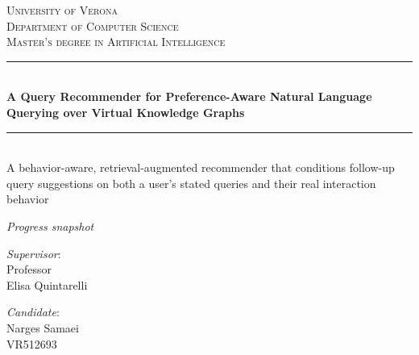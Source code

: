 \documentclass[a4paper,11pt]{report}
\begin{document}
\begin{titlepage}
\newcommand{\HRule}{\rule{\linewidth}{0.5mm}} %
\setlength{\topmargin}{0in}
\center


\textsc{\huge University of Verona}\\[0.2cm] %
\textsc{\large Department of Computer Science}\\[0.1cm] %
\textsc{\large Master's degree in Artificial Intelligence}\\[4cm]

\HRule \\[0.5cm]
{ \LARGE \bfseries A Query Recommender for Preference-Aware Natural Language Querying over Virtual Knowledge Graphs}

\HRule \\[1cm]

{\large A behavior-aware, retrieval-augmented recommender that conditions follow-up query
suggestions on both a user's stated queries and their real interaction behavior}

\vspace{1cm}

{\large\itshape Progress snapshot}

\vspace{1cm}


\begin{minipage}[t]{0.49\textwidth}
	{\large{\textit{Supervisor}:\\ Professor\\ Elisa Quintarelli}}


    \vspace{0.5cm}

\end{minipage}\hfill\begin{minipage}[t]{0.47\textwidth}\raggedleft
  {\large{\textit{Candidate}:\\ Narges Samaei\\ VR512693 \\ }}
  \vspace{40mm}
\end{minipage}
\end{titlepage}
\end{document}
